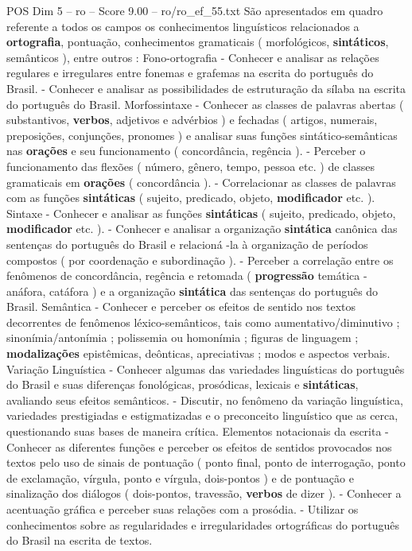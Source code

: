 \begin{textsample}{POS Dim 5 – ro – Score 9.00 – ro/ro\_ef\_55.txt}
São apresentados em quadro referente a todos os campos os conhecimentos linguísticos relacionados a \textbf{ortografia}, pontuação, conhecimentos gramaticais ( morfológicos, \textbf{sintáticos}, semânticos ), entre outros : Fono-ortografia - Conhecer e analisar as relações regulares e irregulares entre fonemas e grafemas na escrita do português do Brasil. - Conhecer e analisar as possibilidades de estruturação da sílaba na escrita do português do Brasil.
Morfossintaxe - Conhecer as classes de palavras abertas ( substantivos, \textbf{verbos}, adjetivos e advérbios ) e fechadas ( artigos, numerais, preposições, conjunções, pronomes ) e analisar suas funções sintático-semânticas nas \textbf{orações} e seu funcionamento ( concordância, regência ). - Perceber o funcionamento das flexões ( número, gênero, tempo, pessoa etc. ) de classes gramaticais em \textbf{orações} ( concordância ). - Correlacionar as classes de palavras com as funções \textbf{sintáticas} ( sujeito, predicado, objeto, \textbf{modificador} etc. ).
Sintaxe - Conhecer e analisar as funções \textbf{sintáticas} ( sujeito, predicado, objeto, \textbf{modificador} etc. ). - Conhecer e analisar a organização \textbf{sintática} canônica das sentenças do português do Brasil e relacioná -la à organização de períodos compostos ( por coordenação e subordinação ). - Perceber a correlação entre os fenômenos de concordância, regência e retomada ( \textbf{progressão} temática - anáfora, catáfora ) e a organização \textbf{sintática} das sentenças do português do Brasil.
Semântica - Conhecer e perceber os efeitos de sentido nos textos decorrentes de fenômenos léxico-semânticos, tais como aumentativo/diminutivo ; sinonímia/antonímia ; polissemia ou homonímia ; figuras de linguagem ; \textbf{modalizações} epistêmicas, deônticas, apreciativas ; modos e aspectos verbais.
Variação Linguística - Conhecer algumas das variedades linguísticas do português do Brasil e suas diferenças fonológicas, prosódicas, lexicais e \textbf{sintáticas}, avaliando seus efeitos semânticos. - Discutir, no fenômeno da variação linguística, variedades prestigiadas e estigmatizadas e o preconceito linguístico que as cerca, questionando suas bases de maneira crítica.
Elementos notacionais da escrita - Conhecer as diferentes funções e perceber os efeitos de sentidos provocados nos textos pelo uso de sinais de pontuação ( ponto final, ponto de interrogação, ponto de exclamação, vírgula, ponto e vírgula, dois-pontos ) e de pontuação e sinalização dos diálogos ( dois-pontos, travessão, \textbf{verbos} de dizer ). - Conhecer a acentuação gráfica e perceber suas relações com a prosódia. - Utilizar os conhecimentos sobre as regularidades e irregularidades ortográficas do português do Brasil na escrita de textos.

\end{textsample}
